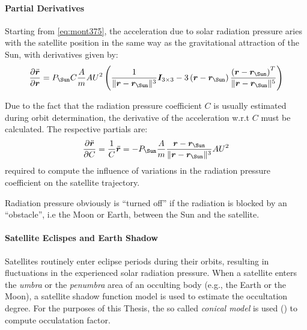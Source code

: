 \paragraph{Partial Derivatives}\label{par:solar-radiation-pressure-partials}
Starting from \ref{eq:mont375}, the acceleration due to solar radiation pressure 
aries with the satellite position in the same way as the gravitational attraction
of the Sun, with derivatives given by:
\begin{equation}
  \label{eq:mont777}
  \frac{\partial \ddot{\bm{r}}}{\partial \bm{r}} = 
  P_{\Sun} C \frac{A}{m} {AU}^2 \left( 
    \frac{1}{\norm{\bm{r} - \bm{r}_{\Sun}}^3} \bm{I}_{3\times 3}
    -3 \left( \bm{r} - \bm{r}_{\Sun} \right) 
      \frac{\left( \bm{r} - \bm{r}_{\Sun} \right) ^T}{\norm{\bm{r} - \bm{r}_{\Sun}}^5}
      \right)
\end{equation}

Due to the fact that the radiation pressure coefficient $C$ is usually estimated 
during orbit determination, the derivative of the acceleration w.r.t $C$ must 
be calculated. The respective partials are:
\begin{equation}
  \label{eq:mont778}
  \frac{\partial \ddot{\bm{r}}}{\partial C} = \frac{1}{C} \ddot{\bm{r}} = 
  -P_{\Sun} \frac{A}{m} 
  \frac{\bm{r} - \bm{r}_{\Sun}}{\norm{\bm{r} - \bm{r}_{\Sun}}^3} {AU}^2
\end{equation}
required to compute the influence of variations in the radiation pressure
coefficient on the satellite trajectory.

Radiation pressure obviously is ``turned oﬀ'' if the radiation is blocked by an 
``obstacle'', i.e the Moon or Earth, between the Sun and the satellite. 

\paragraph{Satellite Eclispes and Earth Shadow}\label{par:occultation}
Satellites routinely enter eclipse periods during their orbits, resulting in 
fluctuations in the experienced solar radiation pressure. When a satellite enters 
the \emph{umbra} or the \emph{penumbra} area of an occulting body (e.g., the 
Earth or the Moon), a satellite shadow function model is used to estimate the 
occultation degree. For the purposes of this Thesis, the so called \emph{conical model} 
is used (\cite{Zhang2019}) to compute occulatation factor.

